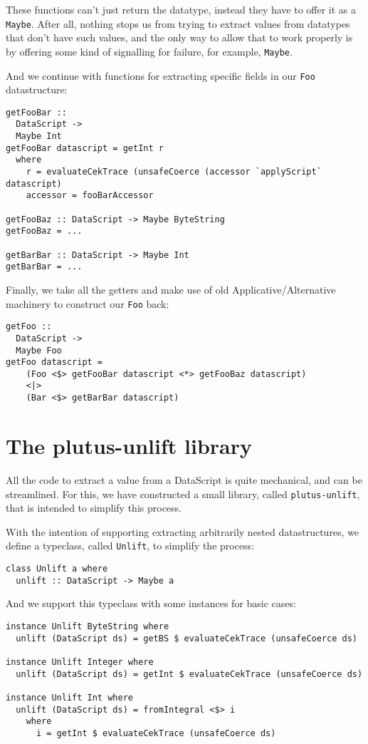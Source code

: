 \documentclass{article}
\begin{document}
These functions can't just return the datatype, instead they have to offer it as a \verb|Maybe|. After all, nothing stops us from trying to extract values from datatypes that don't have such values, and the only way to allow that to work properly is by offering some kind of signalling for failure, for example, \verb|Maybe|.

And we continue with functions for extracting specific fields in our \verb|Foo| datastructure:
\nopagebreak
\begin{verbatim}
getFooBar ::
  DataScript ->
  Maybe Int
getFooBar datascript = getInt r
  where
    r = evaluateCekTrace (unsafeCoerce (accessor `applyScript` datascript)
    accessor = fooBarAccessor

getFooBaz :: DataScript -> Maybe ByteString
getFooBaz = ...

getBarBar :: DataScript -> Maybe Int
getBarBar = ...
\end{verbatim}

Finally, we take all the getters and make use of old Applicative/Alternative machinery to construct our \verb|Foo| back:
\nopagebreak

\begin{verbatim}
getFoo ::
  DataScript ->
  Maybe Foo
getFoo datascript =
    (Foo <$> getFooBar datascript <*> getFooBaz datascript)
    <|>
    (Bar <$> getBarBar datascript)
\end{verbatim}

\section{The plutus-unlift library}
All the code to extract a value from a DataScript is quite mechanical, and can be streamlined. For this, we have constructed a small library, called \verb|plutus-unlift|, that is intended to simplify this process.

With the intention of supporting extracting arbitrarily nested datastructures, we define a typeclass, called \verb|Unlift|, to simplify the process:
\nopagebreak

\begin{verbatim}
class Unlift a where
  unlift :: DataScript -> Maybe a
\end{verbatim}

And we support this typeclass with some instances for basic cases:
\nopagebreak

\begin{verbatim}
instance Unlift ByteString where
  unlift (DataScript ds) = getBS $ evaluateCekTrace (unsafeCoerce ds)
  
instance Unlift Integer where
  unlift (DataScript ds) = getInt $ evaluateCekTrace (unsafeCoerce ds)

instance Unlift Int where
  unlift (DataScript ds) = fromIntegral <$> i
    where
      i = getInt $ evaluateCekTrace (unsafeCoerce ds)
\end{verbatim}
\end{document}
